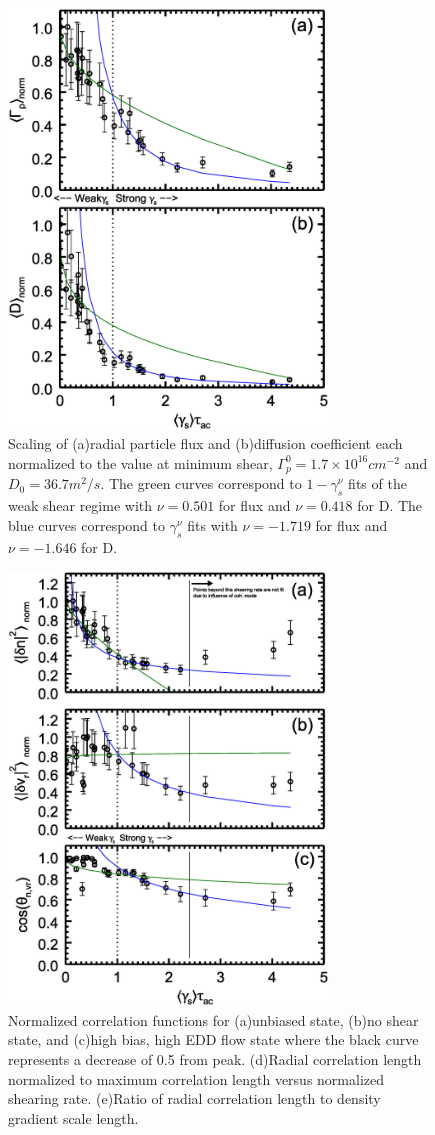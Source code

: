 \documentclass[aip,pop,amsmath,amssymb,reprint,superscriptaddress]{revtex4-1} %
\begin{document}
\begin{figure}[!htbp]
\centerline{
\includegraphics[width=8.5cm]{figure3.eps}}
\caption{\label{fig:fluxandD} Scaling of (a)radial particle flux and (b)diffusion coefficient each normalized to the value at minimum shear, $\Gamma_{p}^{0} = 1.7\times10^{16} cm^{-2}$ and $D_{0} = 36.7 m^{2}/s$. The green curves correspond to $1-\gamma_{s}^{\nu}$ fits of the weak shear regime with $\nu = 0.501$ for flux and $\nu = 0.418$ for D. The blue curves correspond to $\gamma_{s}^{\nu}$ fits with $\nu = -1.719$ for flux and $\nu = -1.646$ for D.}
\end{figure}

\begin{figure}[!htbp]
\centerline{
\includegraphics[width=8.5cm]{figure4.eps}}
\caption{\label{fig:radcorr} Normalized correlation functions for (a)unbiased state, (b)no shear state, and (c)high bias, high EDD flow state where the black curve represents a decrease of 0.5 from peak. (d)Radial correlation length normalized to maximum correlation length versus normalized shearing rate. (e)Ratio of radial correlation length to density gradient scale length.}
\end{figure}
\end{document}

